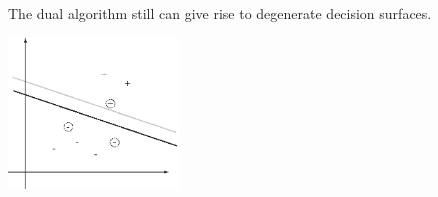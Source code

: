 \documentclass[a4paper,blends,pdf,colorBG,slideColor]{prosper}
\begin{document}
The dual algorithm still can give rise to degenerate decision surfaces.

\vspace{.5in}

\begin{center}
\includegraphics[height=40mm]{figures/fig05-06.eps}
 \end{center}

\es
\end{document}
